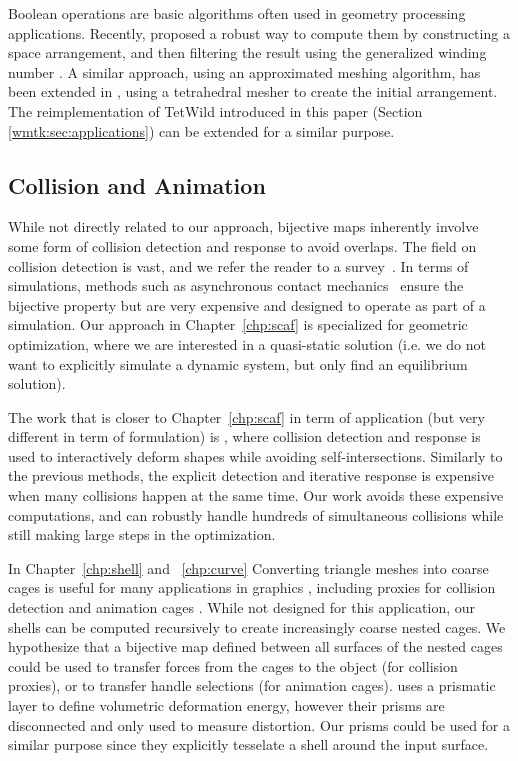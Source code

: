 Boolean operations are basic algorithms often used in geometry processing applications. Recently, \cite{zhou2016mesh} proposed a robust way to compute them by constructing a space arrangement, and then filtering the result using the generalized winding number \cite{Jacobson:2013}. A similar approach, using an approximated meshing algorithm, has been extended in \cite{Hu:2019:fTetWild}, using a tetrahedral mesher to create the initial arrangement. The reimplementation of TetWild introduced in this paper (Section \ref{wmtk:sec:applications}) can be extended for a similar purpose.

\subsection{Collision and Animation}
While not directly related to our approach, bijective maps inherently  involve some form of collision detection and response to avoid overlaps.  The field on collision detection is vast, and we refer the reader to a survey~\cite{jimenez:2001}. 
In terms of simulations, methods such as asynchronous contact mechanics~\cite{Harmon:2009,harmon2010robust,Ainsley:2012} ensure the bijective property but are very expensive and designed to operate as part of a simulation. Our approach in Chapter~\ref{chp:scaf} is specialized for geometric optimization, where we are interested in a  quasi-static solution (i.e. we do not want to explicitly simulate a dynamic system, but only find an equilibrium solution).

The work that is closer to Chapter~\ref{chp:scaf} in term of application (but very different in term of formulation) is \cite{Harmon:2011}, where collision detection and response is used to interactively deform shapes while avoiding self-intersections. Similarly to the previous methods, the explicit detection and iterative response is expensive when many collisions happen at the same time.  Our work avoids these expensive computations, and can robustly handle hundreds of simultaneous collisions while still making large steps in the optimization.

In Chapter~\ref{chp:shell} and ~\ref{chp:curve}
Converting triangle meshes into coarse cages is useful for many applications in graphics \cite{sacht2015nested}, including proxies for collision detection \cite{Calderon:2017} and animation cages \cite{Thiery:2012}. While not designed for this application, our shells can be computed recursively to create increasingly coarse nested cages. We hypothesize that a bijective map defined between all surfaces of the nested cages could be used to transfer forces from the cages to the object (for collision proxies), or to transfer handle selections (for animation cages). \cite{botsch2006primo,botsch2003multiresolution} uses a prismatic layer to define volumetric deformation energy, however their prisms are disconnected and only used to measure distortion. Our prisms could be used for a similar purpose since they explicitly tesselate a shell around the input surface.


